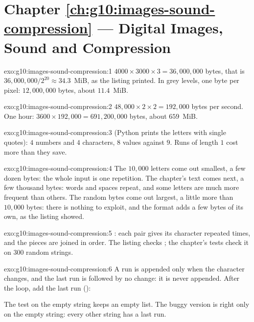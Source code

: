 \section*{Chapter \ref{ch:g10:images-sound-compression} --- Digital Images, Sound and Compression}

\begin{solution}{exo:g10:images-sound-compression:1}
$4000 \times 3000 \times 3 = 36{,}000{,}000$ bytes, that is $36{,}000{,}000 / 2^{20} \approx 34.3$~MiB, as the listing
printed. In grey levels, one byte per pixel: $12{,}000{,}000$ bytes, about $11.4$~MiB.
\end{solution}

\begin{solution}{exo:g10:images-sound-compression:2}
$48{,}000 \times 2 \times 2 = 192{,}000$ bytes per second. One hour: $3600 \times 192{,}000 = 691{,}200{,}000$ bytes,
about $659$~MiB.
\end{solution}

\begin{solution}{exo:g10:images-sound-compression:3}
\code{[(3, "A"), (1, "B"), (4, "C"), (1, "D")]} (Python prints the letters with single quotes): $4$ numbers and $4$
characters, $8$ values against $9$. Runs of length $1$ cost more than they save.
\end{solution}

\begin{solution}{exo:g10:images-sound-compression:4}
The $10{,}000$ letters  come out smallest, a few dozen bytes: the whole input is one repetition. The chapter's
text comes next, a few thousand bytes: words and spaces repeat, and some letters are much more frequent than others.
The random bytes come out largest, a little more than $10{,}000$ bytes: there is nothing to exploit, and the format
adds a few bytes of its own, as the listing showed.
\end{solution}

\begin{solution}{exo:g10:images-sound-compression:5}
: each pair gives its character repeated  times,
and the pieces are joined in order. The listing checks ; the chapter's tests
check it on $300$ random strings.
\end{solution}

\begin{solution}{exo:g10:images-sound-compression:6}
A run is appended only when the character changes, and the last run is followed by no change: it is never appended.
After the loop, add the last run ():

\smallskip\noindent\hspace*{2em}

\smallskip\noindent The test on the empty string keeps an empty list. The buggy version is right only on the empty string: every other string has a last run.
\end{solution}

